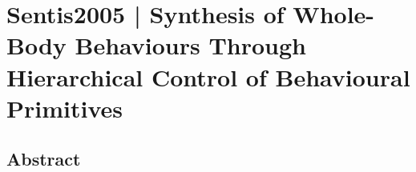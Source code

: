 \section{Sentis2005 | Synthesis of Whole-Body Behaviours Through Hierarchical Control of Behavioural Primitives}

\cite{sentis2005} 

\subsection{Abstract}
